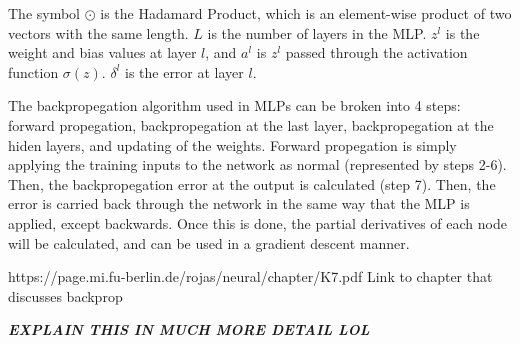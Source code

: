 	\par The symbol $\odot$ is the Hadamard Product, which is an element-wise product of two vectors with the same length. $L$ is the number of layers in the MLP. $z^l$ is the weight and bias values at layer $l$, and $a^l$ is $z^l$ passed through the activation function $\sigma(z)$. $\delta^l$ is the error at layer $l$.
	\par The backpropegation algorithm used in MLPs can be broken into 4 steps: forward propegation, backpropegation at the last layer, backpropegation at the hiden layers, and updating of the weights. 
	Forward propegation is simply applying the training inputs to the network as normal (represented by steps 2-6). Then, the backpropegation error at the output is calculated (step 7). Then, the error is carried back through the network in the same way that the MLP is applied, except backwards. Once this is done, the partial derivatives of each node will be calculated, and can be used in a gradient descent manner.

	\par https://page.mi.fu-berlin.de/rojas/neural/chapter/K7.pdf Link to chapter that discusses backprop
	\par \textbf{\textit{ EXPLAIN THIS IN MUCH MORE DETAIL LOL}}
